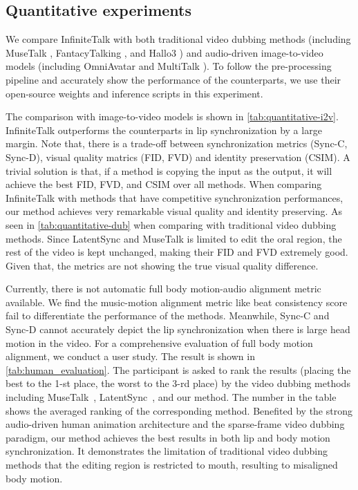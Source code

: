 \subsection{Quantitative experiments}





We compare InfiniteTalk with both traditional video dubbing methods (including MuseTalk \cite{musetalk}, FantacyTalking \cite{wang2025fantasytalking}, and Hallo3 \cite{cui2024hallo3}) and audio-driven image-to-video models (including OmniAvatar \cite{gan2025omniavatar} and MultiTalk \cite{kong2025let}). To follow the pre-processing pipeline and accurately show the performance of the counterparts, we use their open-source weights and inference scripts in this experiment. 

The comparison with image-to-video models is shown in \cref{tab:quantitative-i2v}. InfiniteTalk outperforms the counterparts in lip synchronization by a large margin. Note that, there is a trade-off between synchronization metrics (Sync-C, Sync-D), visual quality matrics (FID, FVD) and identity preservation (CSIM). A trivial solution is that, if a method is copying the input as the output, it will achieve the best FID, FVD, and CSIM over all methods. When comparing InfiniteTalk with methods that have competitive synchronization performances, our method achieves very remarkable visual quality and identity preserving. As seen in \cref{tab:quantitative-dub} when comparing with traditional video dubbing methods. Since LatentSync \cite{li2024latentsync} and MuseTalk \cite{musetalk} is limited to edit the oral region, the rest of the video is kept unchanged, making their FID and FVD extremely good. Given that, the metrics are not showing the true visual quality difference. 

Currently, there is not automatic full body motion-audio alignment metric available. We find the music-motion alignment metric like beat consistency score fail to differentiate the performance of the methods. Meanwhile, Sync-C and Sync-D cannot accurately depict the lip synchronization when there is large head motion in the video.
For a comprehensive evaluation of full body motion alignment, we conduct a user study. 
The result is shown in \cref{tab:human_evaluation}. The participant is asked to rank the results (placing the best to the 1-st place, the worst to the 3-rd place) by the video dubbing methods including MuseTalk~\cite{musetalk}, LatentSync~\cite{li2024latentsync}, and our method. The number in the table shows the averaged ranking of the corresponding method. Benefited by the strong audio-driven human animation architecture and the sparse-frame video dubbing paradigm, our method achieves the best results in both lip and body motion synchronization. It demonstrates the limitation of traditional video dubbing methods that the editing region is restricted to mouth, resulting to misaligned body motion.

